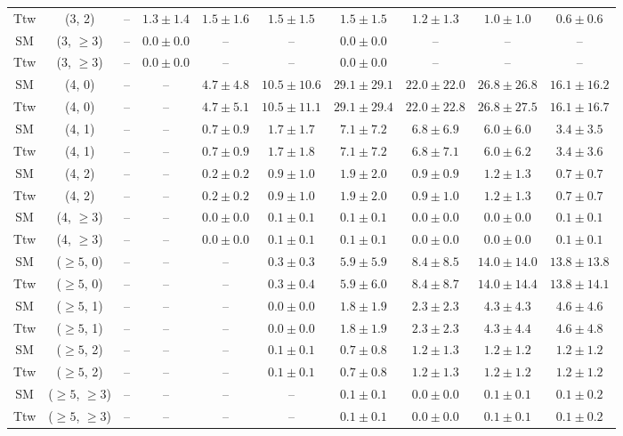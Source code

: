 \begin{table}[h!]
{\begin{tabular}{cccccccccc}
	Ttw & (3, 2) & -- & $1.3\pm 1.4$ & $1.5\pm 1.6$ & $1.5\pm 1.5$ & $1.5\pm 1.5$ & $1.2\pm 1.3$ & $1.0\pm 1.0$ & $0.6\pm 0.6$ \\[0.5ex] 
	SM & (3, $\ge3$) & -- & $0.0\pm 0.0$ & -- & -- & $0.0\pm 0.0$ & -- & -- & -- \\[0.5ex] 
	Ttw & (3, $\ge3$) & -- & $0.0\pm 0.0$ & -- & -- & $0.0\pm 0.0$ & -- & -- & -- \\[0.5ex] 
	SM & (4, 0) & -- & -- & $4.7\pm 4.8$ & $10.5\pm 10.6$ & $29.1\pm 29.1$ & $22.0\pm 22.0$ & $26.8\pm 26.8$ & $16.1\pm 16.2$ \\[0.5ex] 
	Ttw & (4, 0) & -- & -- & $4.7\pm 5.1$ & $10.5\pm 11.1$ & $29.1\pm 29.4$ & $22.0\pm 22.8$ & $26.8\pm 27.5$ & $16.1\pm 16.7$ \\[0.5ex] 
	SM & (4, 1) & -- & -- & $0.7\pm 0.9$ & $1.7\pm 1.7$ & $7.1\pm 7.2$ & $6.8\pm 6.9$ & $6.0\pm 6.0$ & $3.4\pm 3.5$ \\[0.5ex] 
	Ttw & (4, 1) & -- & -- & $0.7\pm 0.9$ & $1.7\pm 1.8$ & $7.1\pm 7.2$ & $6.8\pm 7.1$ & $6.0\pm 6.2$ & $3.4\pm 3.6$ \\[0.5ex] 
	SM & (4, 2) & -- & -- & $0.2\pm 0.2$ & $0.9\pm 1.0$ & $1.9\pm 2.0$ & $0.9\pm 0.9$ & $1.2\pm 1.3$ & $0.7\pm 0.7$ \\[0.5ex] 
	Ttw & (4, 2) & -- & -- & $0.2\pm 0.2$ & $0.9\pm 1.0$ & $1.9\pm 2.0$ & $0.9\pm 1.0$ & $1.2\pm 1.3$ & $0.7\pm 0.7$ \\[0.5ex] 
	SM & (4, $\ge3$) & -- & -- & $0.0\pm 0.0$ & $0.1\pm 0.1$ & $0.1\pm 0.1$ & $0.0\pm 0.0$ & $0.0\pm 0.0$ & $0.1\pm 0.1$ \\[0.5ex] 
	Ttw & (4, $\ge3$) & -- & -- & $0.0\pm 0.0$ & $0.1\pm 0.1$ & $0.1\pm 0.1$ & $0.0\pm 0.0$ & $0.0\pm 0.0$ & $0.1\pm 0.1$ \\[0.5ex] 
	SM & ($\ge5$, 0) & -- & -- & -- & $0.3\pm 0.3$ & $5.9\pm 5.9$ & $8.4\pm 8.5$ & $14.0\pm 14.0$ & $13.8\pm 13.8$ \\[0.5ex] 
	Ttw & ($\ge5$, 0) & -- & -- & -- & $0.3\pm 0.4$ & $5.9\pm 6.0$ & $8.4\pm 8.7$ & $14.0\pm 14.4$ & $13.8\pm 14.1$ \\[0.5ex] 
	SM & ($\ge5$, 1) & -- & -- & -- & $0.0\pm 0.0$ & $1.8\pm 1.9$ & $2.3\pm 2.3$ & $4.3\pm 4.3$ & $4.6\pm 4.6$ \\[0.5ex] 
	Ttw & ($\ge5$, 1) & -- & -- & -- & $0.0\pm 0.0$ & $1.8\pm 1.9$ & $2.3\pm 2.3$ & $4.3\pm 4.4$ & $4.6\pm 4.8$ \\[0.5ex] 
	SM & ($\ge5$, 2) & -- & -- & -- & $0.1\pm 0.1$ & $0.7\pm 0.8$ & $1.2\pm 1.3$ & $1.2\pm 1.2$ & $1.2\pm 1.2$ \\[0.5ex] 
	Ttw & ($\ge5$, 2) & -- & -- & -- & $0.1\pm 0.1$ & $0.7\pm 0.8$ & $1.2\pm 1.3$ & $1.2\pm 1.2$ & $1.2\pm 1.2$ \\[0.5ex] 
	SM & ($\ge5$, $\ge3$) & -- & -- & -- & -- & $0.1\pm 0.1$ & $0.0\pm 0.0$ & $0.1\pm 0.1$ & $0.1\pm 0.2$ \\[0.5ex] 
	Ttw & ($\ge5$, $\ge3$) & -- & -- & -- & -- & $0.1\pm 0.1$ & $0.0\pm 0.0$ & $0.1\pm 0.1$ & $0.1\pm 0.2$ \\[0.5ex] 
	\hline
	\hline
\end{tabular}}
\end{table}
